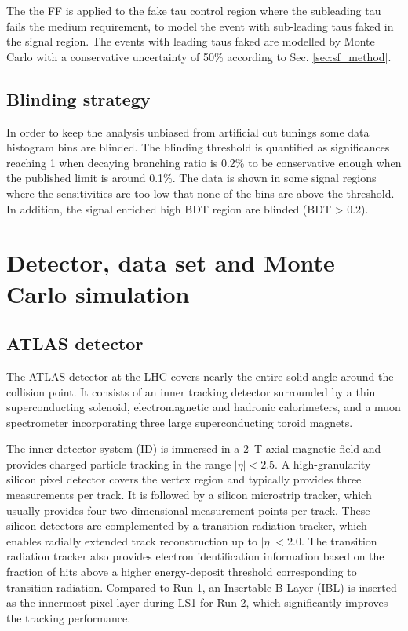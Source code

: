 The the FF is applied to the fake tau control region where the subleading tau fails the medium requirement, to model the event with sub-leading taus faked in the signal region. The events with leading taus faked are modelled by Monte Carlo with a conservative uncertainty of 50\% according to Sec. \ref{sec:sf_method}.

\subsection{Blinding strategy}
\label{sec:blind}

In order to keep the analysis unbiased from artificial cut tunings some data histogram bins are blinded. The blinding threshold is quantified as significances reaching 1 when decaying branching ratio is 0.2\% to be conservative enough when the published limit is around 0.1\%. The data is shown in some signal regions where the sensitivities are too low that none of the bins are above the threshold. In addition, the signal enriched high BDT region are blinded (BDT > 0.2).

\section{Detector, data set and Monte Carlo simulation}

\subsection{ATLAS detector}
\label{sec:detector}

The ATLAS detector \cite{PERF-2007-01} at the LHC covers nearly the entire solid angle around the collision point. It consists of an inner tracking detector surrounded by a thin superconducting solenoid, electromagnetic and hadronic calorimeters, and a muon spectrometer incorporating three large superconducting toroid magnets.

The inner-detector system (ID) is immersed in a \SI{2}{T} axial magnetic field and provides charged particle tracking in the range $| \eta | < 2.5$. A high-granularity silicon pixel detector covers the vertex region and typically provides three measurements per track. It is followed by a silicon microstrip tracker, which usually provides four two-dimensional measurement points per track. These silicon detectors are complemented by a transition radiation tracker, which enables radially extended track reconstruction up to $| \eta | < 2.0$. The transition radiation tracker also provides electron identification information based on the fraction of hits above a higher energy-deposit threshold corresponding to transition radiation. Compared to Run-1, an Insertable B-Layer \cite{IBL} (IBL) is inserted as the innermost pixel layer during LS1 for Run-2, which significantly improves the tracking performance.

